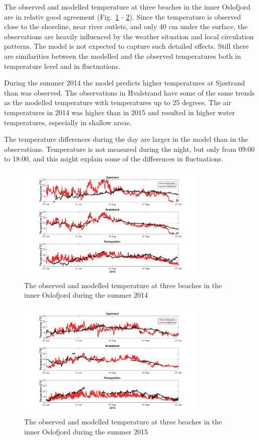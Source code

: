 \documentclass[12pt,a4paper,english]{article}
\begin{document}
The observed and modelled temperature at three beaches in the inner Oslofjord are in relativ good agreement (Fig.~\ref{fig:badetemp_2014} - \ref{fig:badetemp_2015}). Since the temperature is observed close to the shoreline, near river outlets, and only 40 cm under the surface, the observations are heavily influenced by the weather situation and local circulation patterns. The model is not expected to capture such detailed effects. Still there are similarities between the modelled and the observed temperatures both in temperature level and in fluctuations. 

During the summer 2014 the model predicts higher temperatures at Sj\o strand than was observed. The observations in Hvalstrand have some of the same trends as the modelled temperature with temperatures up to 25 degrees. The air temperatures in 2014 was higher than in 2015 and resulted in higher water temperatures, especially in shallow areas. 

The temperature differences during the day are larger in the model than in the observations. Temperature is not measured during the night, but only from 09:00 to 18:00, and this might explain some of the differences in fluctuations.

\begin{figure}[ht]
\centerline{
\includegraphics*[trim=0 0 0 0,clip=true,width=0.8\textwidth]{Figurer/badetemp_2014}
}
\caption{\small
The observed and modelled temperature at three beaches in the inner Oslofjord during the summer 2014}
\label{fig:badetemp_2014}
\end{figure}

\begin{figure}[ht]
\centerline{
\includegraphics*[trim=0 0 0 0,clip=true,width=0.8\textwidth]{Figurer/badetemp_2015}
}
\caption{\small
The observed and modelled temperature at three beaches in the inner Oslofjord during the summer 2015}
\label{fig:badetemp_2015}
\end{figure}
\end{document}
